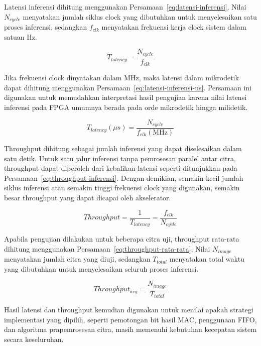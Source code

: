 	Latensi inferensi dihitung menggunakan Persamaan~\ref{eq:latensi-inferensi}. Nilai $N_{cycle}$ menyatakan jumlah siklus clock yang dibutuhkan untuk menyelesaikan satu proses inferensi, sedangkan $f_{clk}$ menyatakan frekuensi kerja clock sistem dalam satuan Hz.

	\begin{equation}
		T_{latency} = \frac{N_{cycle}}{f_{clk}}
		\label{eq:latensi-inferensi}
	\end{equation}

	Jika frekuensi clock dinyatakan dalam MHz, maka latensi dalam mikrodetik dapat dihitung menggunakan Persamaan~\ref{eq:latensi-inferensi-us}. Persamaan ini digunakan untuk memudahkan interpretasi hasil pengujian karena nilai latensi inferensi pada FPGA umumnya berada pada orde mikrodetik hingga milidetik.

	\begin{equation}
		T_{latency}(\mu s) = \frac{N_{cycle}}{f_{clk}(\text{MHz})}
		\label{eq:latensi-inferensi-us}
	\end{equation}

	Throughput dihitung sebagai jumlah inferensi yang dapat diselesaikan dalam satu detik. Untuk satu jalur inferensi tanpa pemrosesan paralel antar citra, throughput dapat diperoleh dari kebalikan latensi seperti ditunjukkan pada Persamaan~\ref{eq:throughput-inferensi}. Dengan demikian, semakin kecil jumlah siklus inferensi atau semakin tinggi frekuensi clock yang digunakan, semakin besar throughput yang dapat dicapai oleh akselerator.

	\begin{equation}
		Throughput = \frac{1}{T_{latency}} = \frac{f_{clk}}{N_{cycle}}
		\label{eq:throughput-inferensi}
	\end{equation}

	Apabila pengujian dilakukan untuk beberapa citra uji, throughput rata-rata dihitung menggunakan Persamaan~\ref{eq:throughput-rata-rata}. Nilai $N_{image}$ menyatakan jumlah citra yang diuji, sedangkan $T_{total}$ menyatakan total waktu yang dibutuhkan untuk menyelesaikan seluruh proses inferensi.

	\begin{equation}
		Throughput_{avg} = \frac{N_{image}}{T_{total}}
		\label{eq:throughput-rata-rata}
	\end{equation}

	Hasil latensi dan throughput kemudian digunakan untuk menilai apakah strategi implementasi yang dipilih, seperti pemotongan bit hasil MAC, penggunaan FIFO, dan algoritma prapemrosesan citra, masih memenuhi kebutuhan kecepatan sistem secara keseluruhan.
